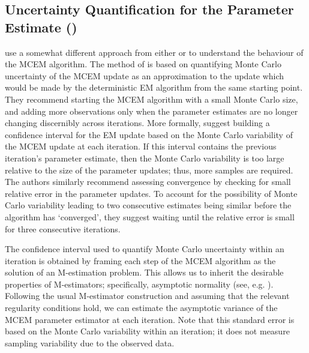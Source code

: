 \documentclass[11pt, oneside]{article}   	%
\begin{document}
    


\subsection{Uncertainty Quantification for the Parameter Estimate (\citealp{Boo99})}

 \citet{Boo99} use a somewhat different approach from either \citet{Wei90} or \citet{Cha95} to understand the behaviour of the MCEM algorithm. The method of \citeauthor{Boo99} is based on quantifying Monte Carlo uncertainty of the MCEM update as an approximation to the update which would be made by the deterministic EM algorithm from the same starting point. They recommend starting the MCEM algorithm with a small Monte Carlo size, and adding more observations only when the parameter estimates are no longer changing discernibly across iterations. More formally, \citeauthor{Boo99} suggest building a confidence interval for the EM update based on the Monte Carlo variability of the MCEM update at each iteration. If this interval contains the previous iteration's parameter estimate, then the Monte Carlo variability is too large relative to the size of the parameter updates; thus, more samples are required. The authors similarly recommend assessing convergence by checking for small relative error in the parameter updates. To account for the possibility of Monte Carlo variability leading to two consecutive estimates being similar before the algorithm has `converged', they suggest waiting until the relative error is small for three consecutive iterations.

The confidence interval used to quantify Monte Carlo uncertainty within an iteration is obtained by framing each step of the MCEM algorithm as the solution of an M-estimation problem. This allows us to inherit the desirable properties of M-estimators; specifically, asymptotic normality (see, e.g. \citealp{van98}). Following the usual M-estimator construction and assuming that the relevant regularity conditions hold, we can estimate the asymptotic variance of the MCEM parameter estimator at each iteration. Note that this standard error is based on the Monte Carlo variability within an iteration; it does not measure sampling variability due to the observed data. 
\end{document}
